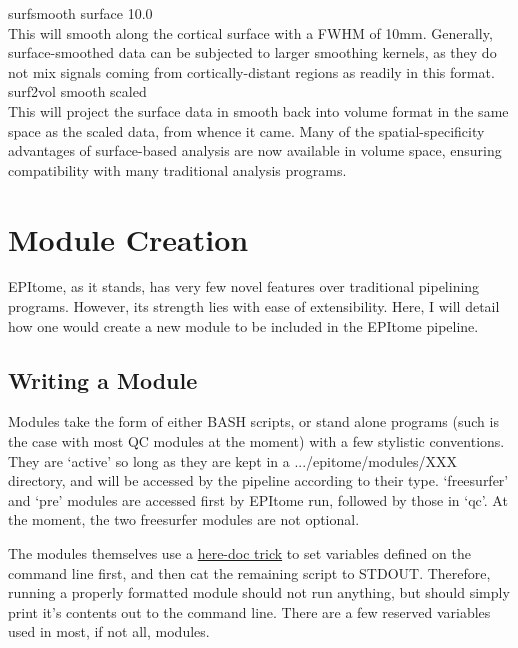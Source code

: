 \documentclass[final,titlepage,letterpaper,oneside,12pt]{article}
\renewcommand{\texttt}[2][BrickRed]{\textcolor{#1}{\ttfamily #2}}%
\begin{document}
\noindent
\texttt{surfsmooth surface 10.0} \\

This will smooth along the cortical surface with a FWHM of 10mm. Generally, surface-smoothed data can be subjected to larger smoothing kernels, as they do not mix signals coming from cortically-distant regions as readily in this format. \\

\noindent
\texttt{surf2vol smooth scaled} \\

This will project the surface data in smooth back into volume format in the same space as the scaled data, from whence it came. Many of the spatial-specificity advantages of surface-based analysis are now available in volume space, ensuring compatibility with many traditional analysis programs.

\section{Module Creation}

EPItome, as it stands, has very few novel features over traditional pipelining programs. However, its strength lies with ease of extensibility. Here, I will detail how one would create a new module to be included in the EPItome pipeline.

\subsection{Writing a Module}

Modules take the form of either BASH scripts, or stand alone programs (such is the case with most QC modules at the moment) with a few stylistic conventions. They are `active' so long as they are kept in a \texttt{.../epitome/modules/XXX} directory, and will be accessed by the pipeline according to their type. `freesurfer' and `pre' modules are accessed first by \texttt{EPItome run}, followed by those in `qc'. At the moment, the two freesurfer modules are not optional.

The modules themselves use a \href{http://tldp.org/LDP/abs/html/here-docs.html}{here-doc trick} to set variables defined on the command line first, and then \texttt{cat} the remaining script to \texttt{STDOUT}. Therefore, running a properly formatted module should not run anything, but should simply print it's contents out to the command line. There are a few reserved variables used in most, if not all, modules. 
\end{document}
